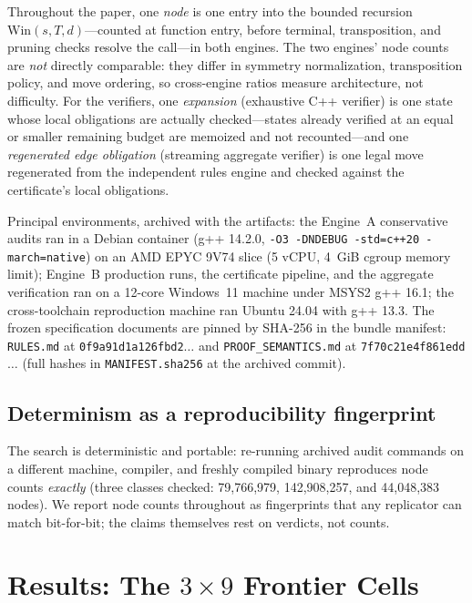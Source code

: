 \documentclass[conference]{IEEEtran}
\begin{document}
Throughout the paper, one \emph{node} is one entry into the bounded recursion $\mathrm{Win}(s,T,d)$---counted at function entry, before terminal, transposition, and pruning checks resolve the call---in both engines. The two engines' node counts are \emph{not} directly comparable: they differ in symmetry normalization, transposition policy, and move ordering, so cross-engine ratios measure architecture, not difficulty. For the verifiers, one \emph{expansion} (exhaustive C++ verifier) is one state whose local obligations are actually checked---states already verified at an equal or smaller remaining budget are memoized and not recounted---and one \emph{regenerated edge obligation} (streaming aggregate verifier) is one legal move regenerated from the independent rules engine and checked against the certificate's local obligations.

Principal environments, archived with the artifacts: the Engine~A conservative audits ran in a Debian container (g++ 14.2.0, \texttt{-O3 -DNDEBUG -std=c++20 -march=native}) on an AMD EPYC 9V74 slice (5 vCPU, 4~GiB cgroup memory limit); Engine~B production runs, the certificate pipeline, and the aggregate verification ran on a 12-core Windows~11 machine under MSYS2 g++ 16.1; the cross-toolchain reproduction machine ran Ubuntu 24.04 with g++ 13.3. The frozen specification documents are pinned by SHA-256 in the bundle manifest: \texttt{RULES.md} at \texttt{0f9a91d1a126fbd2$\ldots$} and \texttt{PROOF\_SEMANTICS.md} at \texttt{7f70c21e4f861edd$\ldots$} (full hashes in \texttt{MANIFEST.sha256} at the archived commit).

\subsection{Determinism as a reproducibility fingerprint}

The search is deterministic and portable: re-running archived audit commands on a different machine, compiler, and freshly compiled binary reproduces node counts \emph{exactly} (three classes checked: 79{,}766{,}979, 142{,}908{,}257, and 44{,}048{,}383 nodes). We report node counts throughout as fingerprints that any replicator can match bit-for-bit; the claims themselves rest on verdicts, not counts.

\section{Results: The $3\times 9$ Frontier Cells}
\label{sec:results}
\end{document}
